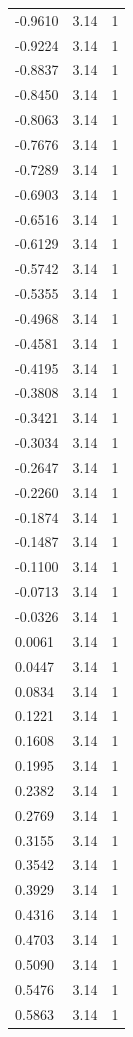 \begin{longtable}{lrr}
  -0.9610 & 3.14 & 1 \\
  -0.9224 & 3.14 & 1 \\
  -0.8837 & 3.14 & 1 \\
  -0.8450 & 3.14 & 1 \\
  -0.8063 & 3.14 & 1 \\
  -0.7676 & 3.14 & 1 \\
  -0.7289 & 3.14 & 1 \\
  -0.6903 & 3.14 & 1 \\
  -0.6516 & 3.14 & 1 \\
  -0.6129 & 3.14 & 1 \\
  -0.5742 & 3.14 & 1 \\
  -0.5355 & 3.14 & 1 \\
  -0.4968 & 3.14 & 1 \\
  -0.4581 & 3.14 & 1 \\
  -0.4195 & 3.14 & 1 \\
  -0.3808 & 3.14 & 1 \\
  -0.3421 & 3.14 & 1 \\
  -0.3034 & 3.14 & 1 \\
  -0.2647 & 3.14 & 1 \\
  -0.2260 & 3.14 & 1 \\
  -0.1874 & 3.14 & 1 \\
  -0.1487 & 3.14 & 1 \\
  -0.1100 & 3.14 & 1 \\
  -0.0713 & 3.14 & 1 \\
  -0.0326 & 3.14 & 1 \\
  0.0061 & 3.14 & 1 \\
  0.0447 & 3.14 & 1 \\
  0.0834 & 3.14 & 1 \\
  0.1221 & 3.14 & 1 \\
  0.1608 & 3.14 & 1 \\
  0.1995 & 3.14 & 1 \\
  0.2382 & 3.14 & 1 \\
  0.2769 & 3.14 & 1 \\
  0.3155 & 3.14 & 1 \\
  0.3542 & 3.14 & 1 \\
  0.3929 & 3.14 & 1 \\
  0.4316 & 3.14 & 1 \\
  0.4703 & 3.14 & 1 \\
  0.5090 & 3.14 & 1 \\
  0.5476 & 3.14 & 1 \\
  0.5863 & 3.14 & 1 \\

\end{longtable}
